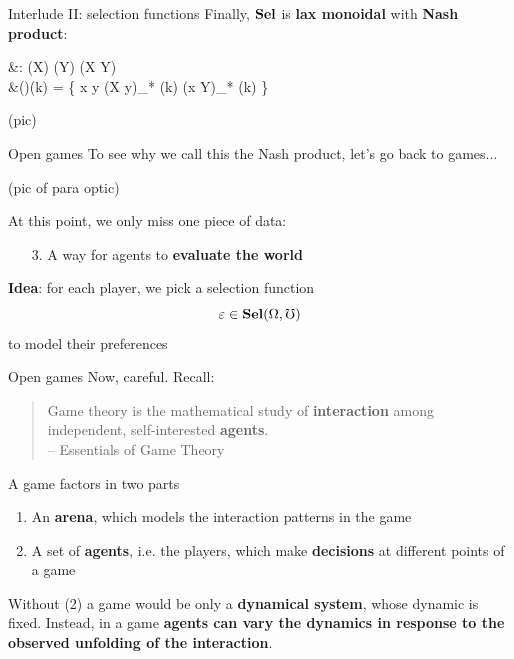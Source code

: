 \begin{frame}{Interlude II: selection functions}
	Finally, $\mathbf{Sel}$ is \textbf{lax monoidal} with \textbf{Nash product}:

	\begin{eqalign*}
		\boxtimes &: \Sel(X) \times \Sel(Y) \to \Sel(X \otimes Y)\\
		&(\varepsilon \boxtimes \eta)(k) = \{ x \otimes y \in (X \otimes y)_* \varepsilon(k) \cap (x \otimes Y)_* \eta(k) \}
	\end{eqalign*}

	(pic)
\end{frame}

\begin{frame}{Open games}
	To see why we call this the Nash product, let's go back to games...

	(pic of para optic)

	At this point, we only miss one piece of data:
	\begin{enumerate}
		\item[3.] A way for agents to \textbf{evaluate the world}
	\end{enumerate}

	\vfill
	\textbf{Idea}: for each player, we pick a selection function
	\begin{equation*}
		\varepsilon \in \mathbf{Sel}(\Omega, \mho)
	\end{equation*}
	to model their preferences
\end{frame}

\begin{frame}{Open games}
	Now, careful. Recall:

	\vfill
	\begin{quotation}
		Game theory is the mathematical study of \textbf{interaction} among independent, self-interested \textbf{agents}.\\
		{\color{colornote}-- Essentials of Game Theory \cite{leyton2008essentials}}
	\end{quotation}


	A game factors in two parts
	\begin{enumerate}
		\item An \textbf{arena}, which models the {interaction patterns} in the game
		\item A set of \textbf{agents}, i.e. the players, which make \textbf{decisions} at different points of a game
	\end{enumerate}

	\vfill
	Without (2) a game would be only a \textbf{dynamical system}, whose dynamic is fixed.
	Instead, in a game \textbf{agents can vary the dynamics in response to the observed unfolding of the interaction}.
\end{frame}

